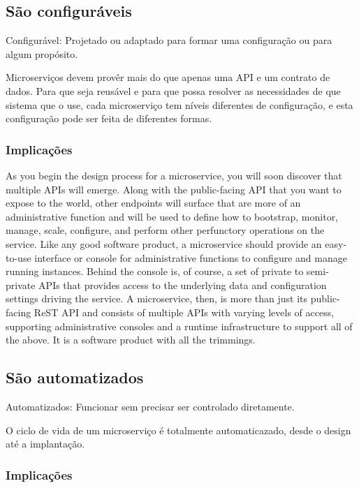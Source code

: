 \subsection{São configuráveis}

Configurável: Projetado ou adaptado para formar uma configuração ou para algum propósito.

Microserviços devem provêr mais do que apenas uma API e um contrato de dados. Para que seja reusável e para que possa resolver as necessidades de que sistema que o use, cada microserviço tem níveis diferentes de configuração, e esta configuração pode ser feita de diferentes formas.

\subsubsection*{Implicações}

As you begin the design process for a microservice, you will soon discover that multiple APIs will emerge. Along with the public-facing API that you want to expose to the world, other endpoints will surface that are more of an administrative function and will be used to define how to bootstrap, monitor, manage, scale, configure, and perform other perfunctory operations on the service. Like any good software product, a microservice should provide an easy-to-use interface or console for administrative functions to configure and manage running instances. Behind the console is, of course, a set of private to semi-private APIs that provides access to the underlying data and configuration settings driving the service. A microservice, then, is more than just its public-facing ReST API and consists of multiple APIs with varying levels of access, supporting administrative consoles and a runtime infrastructure to support all of the above. It is a software product with all the trimmings.

\subsection {São automatizados}

Automatizados: Funcionar sem precisar ser controlado diretamente.

O ciclo de vida de um microserviço é totalmente automaticazado, desde o design até a implantação.

\subsubsection*{Implicações}

